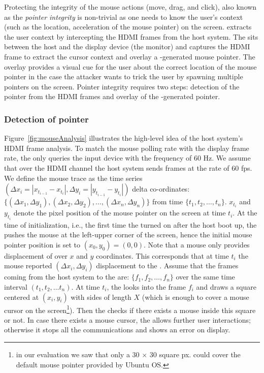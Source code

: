 Protecting the integrity of the mouse actions (move, drag, and click), also known as the \emph{pointer integrity} is non-trivial as one needs to know the user's context (such as the location, acceleration of the mouse pointer) on the screen. \name extracts the user context by intercepting the HDMI frames from the host system. The \device sits between the host and the display device (the monitor) and captures the HDMI frame to extract the cursor context and overlay a \device-generated mouse pointer. The overlay provides a visual cue for the user about the correct location of the mouse pointer in the case the attacker wants to trick the user by spawning multiple pointers on the screen. Pointer integrity requires two steps: detection of the pointer from the HDMI frames and overlay of the \device-generated pointer.

\subsubsection{Detection of pointer} Figure~\ref{fig:mouseAnalysis} illustrates the high-level idea of the host system's HDMI frame analysis. To match the mouse polling rate with the display frame rate, the \device only queries the input device with the frequency of $60$ Hz. We assume that over the HDMI channel the host system sends frames at the rate of $60$ fps. We define the mouse trace as the time series $(\Delta x_i = |x_{t_{i-1}} - x_{t_{i}}|, \Delta y_i=|y_{t_{i-1}} - y_{t_{i}}|)$ delta co-ordinates: $\{(\Delta x_1, \Delta y_1), (\Delta x_2, \Delta y_2), \ldots, (\Delta x_n, \Delta y_n)\}$ from time $\{t_1, t_2, \ldots, t_n\}$. $x_{t_{i}}$ and $y_{t_{i}}$ denote the pixel position of the mouse pointer on the screen at time $t_i$. At the time of initialization, i.e., the first time the \device turned on after the host boot up, the \device pushes the mouse at the left-upper corner of the screen, hence the initial mouse pointer position is set to $(x_0, y_0) = (0, 0)$.  
Note that a mouse only provides displacement of over $x$ and $y$ coordinates. This corresponds that at time $t_i$ the mouse reported $(\Delta x_i, \Delta y_i)$ displacement to the \device. Assume that the frames coming from the host system to the \device are: $\{f_1, f_2, \ldots, f_n\}$ over the same time interval $(t_1, t_2,\ldots t_n)$. At time $t_i$, the \device looks into the frame $f_i$ and draws a square centered at $(x_i, y_i)$ with sides of length $X$ (which is enough to cover a mouse cursor on the screen\footnote{in our evaluation we saw that only a 30 $\times$ 30 square px. could cover the default mouse pointer provided by Ubuntu OS.}). Then the \device checks if there exists a mouse inside this square or not. In case there exists a mouse cursor, the \device allows further user interactions; otherwise it stops all the communications and shows an error on display.

